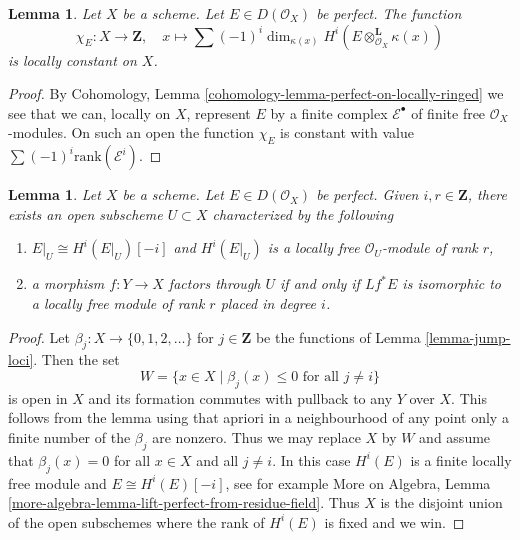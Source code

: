 \documentclass{stacks-project}
\theoremstyle{plain}
\newtheorem{lemma}[subsection]{Lemma}
\theoremstyle{definition}
\theoremstyle{remark}
\numberwithin{equation}{subsection}
\begin{document}
\begin{lemma}
\label{lemma-chi-locally-constant}
Let $X$ be a scheme. Let $E \in D(\mathcal{O}_X)$ be perfect.
The function
$$
\chi_E : X \longrightarrow \mathbf{Z},\quad
x \longmapsto \sum (-1)^i
\dim_{\kappa(x)} H^i(E \otimes_{\mathcal{O}_X}^\mathbf{L} \kappa(x))
$$
is locally constant on $X$.
\end{lemma}

\begin{proof}
By Cohomology, Lemma
\ref{cohomology-lemma-perfect-on-locally-ringed}
we see that we can, locally on $X$, represent $E$ by a finite
complex $\mathcal{E}^\bullet$ of finite free $\mathcal{O}_X$-modules.
On such an open the function $\chi_E$ is constant with value
$\sum (-1)^i \text{rank}(\mathcal{E}^i)$.
\end{proof}

\begin{lemma}
\label{lemma-open-where-cohomology-in-degree-i-rank-r}
Let $X$ be a scheme. Let $E \in D(\mathcal{O}_X)$ be perfect.
Given $i, r \in \mathbf{Z}$, there exists an
open subscheme $U \subset X$ characterized by the following
\begin{enumerate}
\item $E|_U \cong H^i(E|_U)[-i]$ and $H^i(E|_U)$ is a locally free
$\mathcal{O}_U$-module of rank $r$,
\item a morphism $f : Y \to X$ factors through $U$ if and only if
$Lf^*E$ is isomorphic to a locally free module of rank $r$
placed in degree $i$.
\end{enumerate}
\end{lemma}

\begin{proof}
Let $\beta_j : X \to \{0, 1, 2, \ldots\}$ for $j \in \mathbf{Z}$
be the functions of Lemma \ref{lemma-jump-loci}. Then the set
$$
W = \{x \in X \mid \beta_j(x) \leq 0\text{ for all }j \not = i\}
$$
is open in $X$ and its formation commutes with pullback to any
$Y$ over $X$. This follows from the lemma using that
apriori in a neighbourhood of any point only a finite number
of the $\beta_j$ are nonzero. Thus we may replace $X$ by $W$
and assume that $\beta_j(x) = 0$ for all $x \in X$ and all $j \not = i$.
In this case $H^i(E)$ is a finite locally free module and
$E \cong H^i(E)[-i]$, see for example 
More on Algebra, Lemma
\ref{more-algebra-lemma-lift-perfect-from-residue-field}.
Thus $X$ is the disjoint union of the open subschemes where the
rank of $H^i(E)$ is fixed and we win.
\end{proof}
\end{document}
